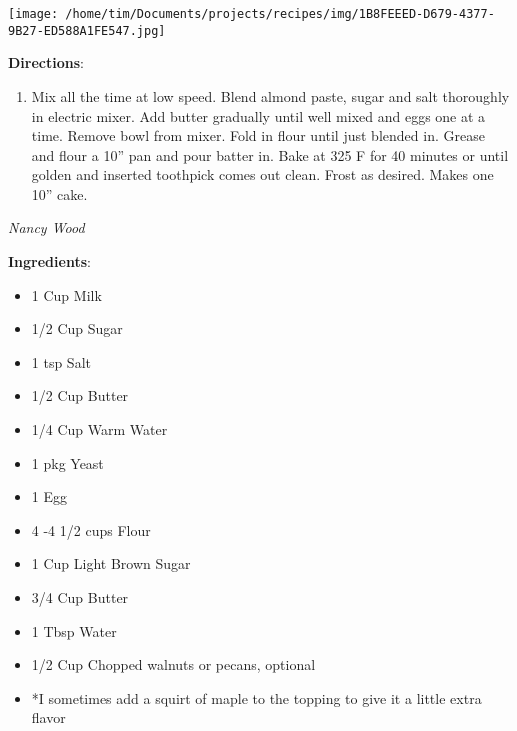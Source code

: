 \documentclass[11pt, twoside, openany]{book}
\begin{document}
\begin{minipage}[t]{0.2\linewidth}
\centering \strut\vspace*{-\baselineskip}\newline
\texttt{[image: /home/tim/Documents/projects/recipes/img/1B8FEEED-D679-4377-9B27-ED588A1FE547.jpg]}\\
\end{minipage}\vspace{3mm}
\textbf{Directions}:
\vspace{-3mm}\begin{enumerate}\setlength\itemsep{-1mm}
\item Mix all the time at low speed. Blend almond paste, sugar and salt thoroughly in electric mixer. Add butter gradually until well mixed and eggs one at a time. Remove bowl from mixer. Fold in flour until just blended in. Grease and flour a 10'' pan and pour batter in. Bake at 325 F for 40 minutes or until golden and inserted toothpick comes out clean. Frost as desired. Makes one 10'' cake.
\end{enumerate}
 \label{sticky-buns}\hfill\textit{Nancy Wood}\\
\begin{minipage}[t]{0.8\linewidth}
\textbf{Ingredients}:\vspace{-3mm}
\begin{multicols}{2}
\begin{itemize}\setlength\itemsep{-1mm}
\item 1 Cup Milk
\item 1/2 Cup Sugar
\item 1 tsp Salt
\item 1/2 Cup Butter
\item 1/4 Cup Warm Water
\item 1 pkg Yeast
\item 1 Egg
\item 4 -4 1/2 cups Flour
\item 1 Cup Light Brown Sugar
\item 3/4 Cup Butter
\item 1 Tbsp Water
\item 1/2 Cup Chopped walnuts or pecans, optional
\item *I sometimes add a squirt of maple to the topping to give it a little extra flavor
\end{itemize}
\end{multicols}
\end{minipage}
\end{document}
